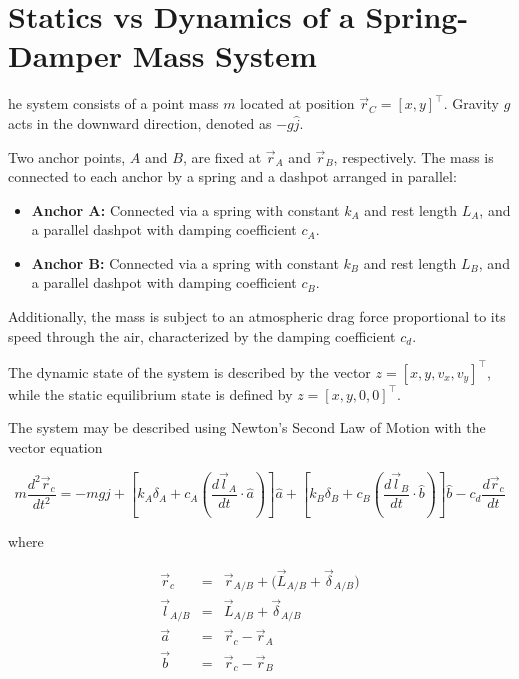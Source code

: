 \section{Statics vs Dynamics of a Spring-Damper Mass System}

he system consists of a point mass $m$ located at position $\vec{r}_C = [x, y]^\top$.
Gravity $g$ acts in the downward direction, denoted as $-g\hat{j}$.

Two anchor points, $A$ and $B$, are fixed at $\vec{r}_A$ and $\vec{r}_B$, respectively.
The mass is connected to each anchor by a spring and a dashpot arranged in parallel:
\begin{itemize}
    \item \textbf{Anchor A:} Connected via a spring with constant $k_A$ and rest length $L_A$, and a parallel dashpot with damping coefficient $c_A$.
    \item \textbf{Anchor B:} Connected via a spring with constant $k_B$ and rest length $L_B$, and a parallel dashpot with damping coefficient $c_B$.
\end{itemize}

Additionally, the mass is subject to an atmospheric drag force proportional to its speed through the air, characterized by the damping coefficient $c_d$.

The dynamic state of the system is described by the vector $z = [x, y, v_x, v_y]^\top$, while the static equilibrium state is defined by $z = [x, y, 0, 0]^\top$.

The system may be described using Newton's Second Law of Motion with the vector equation

\begin{equation}
    m \frac{d^2\vec{r}_c}{dt^2} = -mg\hat{j} + \left[ k_A\delta_A + c_A \left( \frac{d\vec{l}_A}{dt} \cdot \hat{a} \right) \right] \hat{a} + \left[ k_B \delta_B + c_B \left( \frac{d\vec{l}_B}{dt} \cdot \hat{b} \right) \right] \hat{b} - c_d \frac{d\vec{r}_c}{dt}
    \label{Eq:System9}
\end{equation}

where

\begin{eqnarray}
    \vec{r}_c & = & \vec{r}_{A/B} + \big( \vec{L}_{A/B} + \vec\delta_{A/B} \big) \\
    \vec{l}_{A/B} & = & \vec{L}_{A/B} + \vec\delta_{A/B} \nonumber \\
    \vec{a} & = & \vec{r}_c - \vec{r}_A \nonumber \\
    \vec{b} & = & \vec{r}_c - \vec{r}_B \nonumber
    \label{Eq:System9_helper}
\end{eqnarray}

